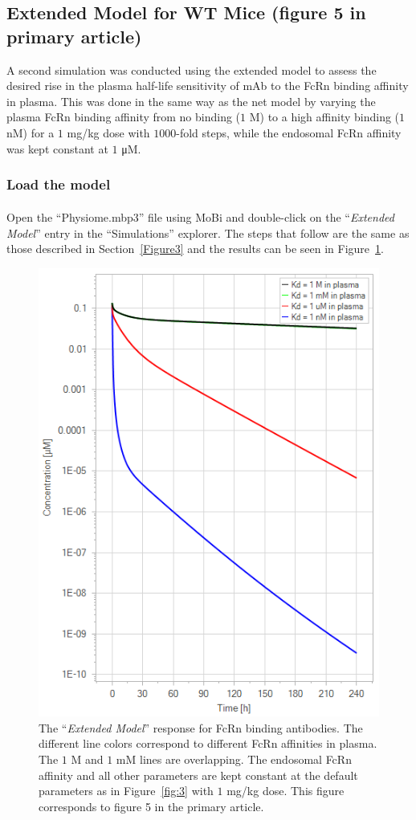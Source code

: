 \documentclass[fleqn,10pt]{physiome}
\begin{document}
\subsection{Extended Model for WT Mice (figure 5 in primary article)}\label{Figure5}

A second simulation was conducted using the extended model to assess the desired rise in the plasma half-life sensitivity of mAb to the FcRn binding affinity in plasma. This was done in the same way as the net model by varying the plasma FcRn binding affinity from no binding ($1$ M) to a high affinity binding ($1$ nM) for a $1$ mg/kg dose with $1000$-fold steps, while the endosomal FcRn affinity was kept constant at $1$ \si{\micro M}.

\subsubsection{Load the model}
Open the ``Physiome.mbp3'' file using MoBi\textsuperscript{\textregistered} and double-click on the ``\textit{Extended Model}'' entry in the ``Simulations'' explorer. The steps that follow are the same as those described in Section~\ref{Figure3} and the results can be seen in Figure~\ref{fig:4}.

\begin{figure}[htb]\centering
    \includegraphics[width=0.49\linewidth]{pl6}
    \caption{The ``\textit{Extended Model}'' response for FcRn binding antibodies. The different line colors correspond to different FcRn affinities in plasma. The $1$ M and $1$ mM lines are overlapping. The endosomal FcRn affinity and all other parameters are kept constant at the default parameters as in Figure~\ref{fig:3} with $1$ mg/kg dose. This figure corresponds to figure 5 in the primary article.}
    \label{fig:4}
\end{figure}
\end{document}
